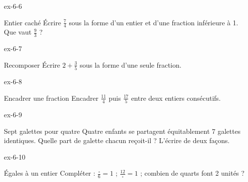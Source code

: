 \begin{blocLivre}{ex-6-6}\begin{exercice}[2]{Entier caché}
Écrire $\frac74$ sous la forme d’un entier et d’une fraction inférieure à 1. Que vaut $\frac93$ ?
\end{exercice}\end{blocLivre}
\begin{blocLivre}{ex-6-7}\begin{exercice}[2]{Recomposer}
Écrire $2+\frac35$ sous la forme d’une seule fraction.
\end{exercice}\end{blocLivre}
\begin{blocLivre}{ex-6-8}\begin{exercice}[2]{Encadrer une fraction}
Encadrer $\frac{11}4$ puis $\frac{17}5$ entre deux entiers consécutifs.
\end{exercice}\end{blocLivre}
\begin{blocLivre}{ex-6-9}\begin{exercice}[2]{Sept galettes pour quatre}
Quatre enfants se partagent équitablement 7 galettes identiques. Quelle part de galette chacun reçoit-il ? L’écrire de deux façons.
\end{exercice}\end{blocLivre}
\begin{blocLivre}{ex-6-10}\begin{exercice}[2]{Égales à un entier}
Compléter : $\frac{\square}6=1$ ; $\frac{12}{\square}=1$ ; combien de quarts font 2 unités ?
\end{exercice}\end{blocLivre}

